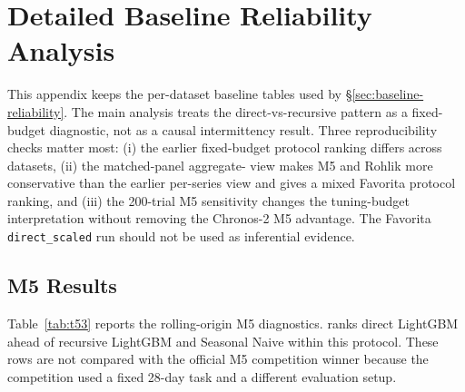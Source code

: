 \section{Detailed Baseline Reliability Analysis}\label{app:baseline-detail}

This appendix keeps the per-dataset baseline tables used by
\S\ref{sec:baseline-reliability}.  The main analysis treats the
direct-vs-recursive pattern as a fixed-budget diagnostic, not as a causal
intermittency result.  Three reproducibility checks matter most:
(i) the earlier fixed-budget protocol ranking differs across datasets,
(ii) the matched-panel aggregate-\WAPE{} view makes M5 and Rohlik more
conservative than the earlier per-series view and gives a mixed Favorita
protocol ranking, and (iii) the 200-trial M5
\LGBM{} sensitivity changes the tuning-budget interpretation without removing
the Chronos-2 M5 advantage.  The Favorita \texttt{direct\_scaled} run
should not be used as inferential evidence.

\subsection{M5 Results}

Table~\ref{tab:t53} reports the rolling-origin M5 diagnostics.  \WRMSSE{}
ranks direct LightGBM ahead of recursive LightGBM and Seasonal Naive within
this protocol.  These rows are not compared with the official M5 competition
winner because the competition used a fixed 28-day task and a different
evaluation setup.

